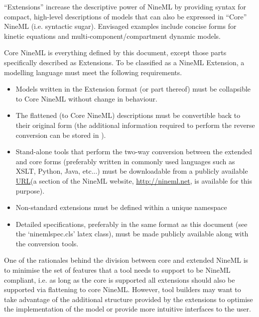 \documentclass[draftspec]{ninemlspec}
\newcommand{\URL}{\href{http://en.wikipedia.org/wiki/Uniform_resource_locator}{URL}\xspace}
\newcommand{\Annotations}{\defRef{\textbf{\class{Annotations}}\xspace}{sec:Annotations}}
\begin{document}
``Extensions'' increase the descriptive power of NineML by providing syntax for compact, high-level descriptions of models that can also be expressed in ``Core'' NineML (i.e. syntactic sugar). Envisaged examples include concise forms for kinetic equations and multi-component/compartment dynamic models. 

Core NineML is everything defined by this document, except those parts specifically described as Extensions. To be classified as a NineML Extension, a modelling language must meet the following requirements.
\begin{itemize}
\item Models written in the Extension format (or part thereof) must be collapsible to Core NineML without change in behaviour.
\item The flattened (to Core NineML) descriptions must be convertible back to their original form (the additional information required to perform the reverse conversion can be stored in \Annotations).
\item Stand-alone tools that perform the two-way conversion between the extended and core forms (preferably written in commonly used languages such as XSLT, Python, Java, etc...) must be downloadable from a publicly available \URL (a section of the NineML website, \href{http://nineml.net}{http://nineml.net}, is available for this purpose).
\item Non-standard extensions must be defined within a unique namespace
\item Detailed specifications, preferably in the same format as this document (see the `ninemlspec.cls' latex class), must be made publicly available along with the conversion tools.
 \label{item:collapsible}
\end{itemize}

One of the rationales behind the division between core and extended NineML is to minimise the set of features that a tool needs to support to be NineML compliant, i.e. as long as the core is supported all extensions should also be supported via flattening to core NineML. However, tool builders may want to take advantage of the additional structure provided by the extensions to optimise the implementation of the model or provide more intuitive interfaces to the user. 

\end{document}
